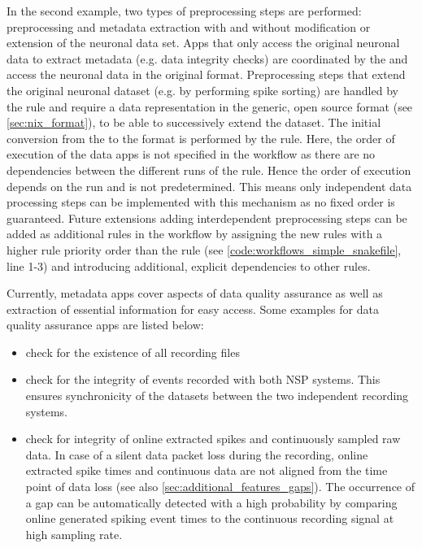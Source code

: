In the second example, two types of preprocessing steps are performed: preprocessing and metadata extraction with and without modification or extension of the neuronal data set. Apps that only access the original neuronal data to extract metadata (e.g. data integrity checks) are coordinated by the  and access the neuronal data in the original  format. Preprocessing steps that extend the original neuronal dataset (e.g. by performing spike sorting) are handled by the  rule and require a data representation in the generic, open source  format (see \cref{sec:nix_format}), to be able to successively extend the dataset. The initial conversion from the  to the  format is performed by the  rule. Here, the order of execution of the data apps is not specified in the  workflow as there are no dependencies between the different runs of the  rule. Hence the order of execution depends on the  run and is not predetermined. This means only independent data processing steps can be implemented with this mechanism as no fixed order is guaranteed. Future extensions adding interdependent preprocessing steps can be added as additional rules in the  workflow by assigning the new rules with a higher rule priority order than the  rule (see \cref{code:workflows_simple_snakefile}, line 1-3) and introducing additional, explicit dependencies to other rules.

Currently, metadata apps cover aspects of data quality assurance as well as extraction of essential information for easy access. Some examples for data quality assurance apps are listed below:
\begin{itemize}
 \item check for the existence of all recording files
 \item check for the integrity of events recorded with both NSP systems. This ensures synchronicity of the datasets between the two independent  recording systems.
 \item check for integrity of online extracted spikes and continuously sampled raw data. In case of a silent data packet loss during the recording, online extracted spike times and continuous data are not aligned from the time point of data loss (see also \cref{sec:additional_features_gaps}). The occurrence of a gap can be automatically detected with a high probability by comparing online generated spiking event times to the continuous recording signal at high sampling rate.
\end{itemize}

